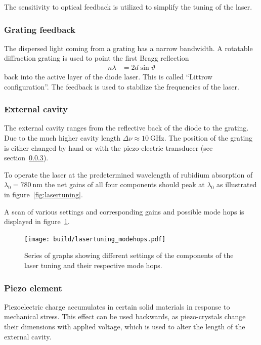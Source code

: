 The sensitivity to optical feedback is utilized to simplify the tuning of the laser.

\subsubsection{Grating feedback}\label{grating-feedback}
The dispersed light coming from a grating has a narrow bandwidth.
A rotatable diffraction grating is used to point the first Bragg reflection
\begin{align}
  n \lambda &= 2 d \sin\!{\vartheta}
\end{align}
back into the active layer of the diode laser.
This is called \enquote{Littrow configuration}.
The feedback is used to stabilize the frequencies of the laser.

\subsubsection{External cavity}\label{external-cavity}
The external cavity ranges from the reflective back of the diode to the grating.
Due to the much higher cavity length $\Delta \nu \approx \SI{10}{\giga\hertz}$.
The position of the grating is either changed by hand or with the piezo-electric transducer (see
section~\ref{sub:piezo-element}).

To operate the laser at the predetermined wavelength of rubidium absorption of
$\lambda_0 = \SI{780}{\nano\meter}$ the net gains of all four components should
peak at $\lambda_0$ as illustrated in figure~\ref{fig:lasertuning}.

A scan of various settings and corresponding gains and possible mode hops is
displayed in figure~\ref{fig:lasertuning_modehops}.
\begin{figure}[ht]
  \centering
  \texttt{[image: build/lasertuning\_modehops.pdf]}
  \caption{Series of graphs showing different settings of the  components of
    the laser tuning and their respective mode hops\cite{anleitung}.}%
  \label{fig:lasertuning_modehops}
\end{figure}

\subsubsection{Piezo element}\label{sub:piezo-element}
Piezoelectric charge accumulates in certain solid materials in response to mechanical stress.
This effect can be used backwards, as piezo-crystals change their dimensions with applied voltage,
which is used to alter the length of the external cavity.

